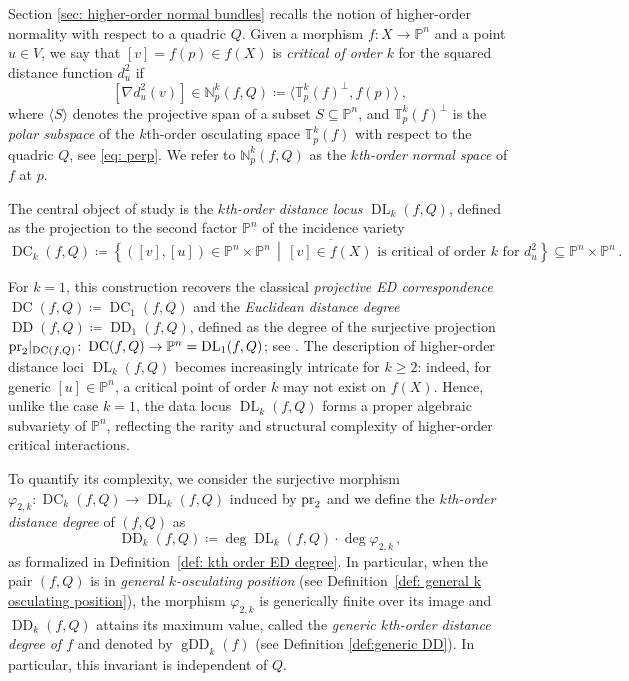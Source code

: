 \documentclass[11pt,reqno]{amsart}
\numberwithin{equation}{section}
\theoremstyle{plain}
\numberwithin{theorem}{section}
\theoremstyle{definition}
\newcommand{\N}{\mathbb{N}}
\renewcommand{\P}{\mathbb{P}}
\newcommand{\T}{\mathbb{T}}
\newcommand{\pr}{{\rm pr}}
\newcommand{\DC}{\operatorname{DC}}
\newcommand{\DL}{\operatorname{DL}}
\newcommand{\DD}{\operatorname{DD}}
\newcommand{\gDD}{\operatorname{gDD}}
\begin{document}
Section \ref{sec: higher-order normal bundles} recalls the notion of higher-order normality with respect to a quadric $Q$. Given a morphism $f\colon X \to \P^n$ and a point $u \in V$, we say that $[v] = f(p) \in f(X)$ is {\em critical of order $k$} for the squared distance function $d_u^2$ if
\[
[\nabla d_u^2(v)] \in \N_p^k(f,Q) \coloneqq \langle \T_p^k(f)^\perp, f(p) \rangle\,,
\]
where $\langle S \rangle$ denotes the projective span of a subset $S \subseteq \P^n$, and $\T_p^k(f)^\perp$ is the {\em polar subspace} of the $k$th-order osculating space $\T_p^k(f)$ with respect to the quadric $Q$, see \eqref{eq: perp}. We refer to $\N_p^k(f,Q)$ as the {\em $k$th-order normal space} of $f$ at $p$.

The central object of study is the {\em $k$th-order distance locus} $\DL_k(f,Q)$, defined as the projection to the second factor $\P^n$ of the incidence variety
\[
\DC_k(f,Q) \coloneqq \overline{\left\{([v], [u]) \in \P^n \times \P^n \,\middle|\, [v] \in f(X) \text{ is critical of order } k \text{ for } d_u^2\right\}}\subseteq\P^n \times \P^n\,.
\]

For $k = 1$, this construction recovers the classical {\em projective ED correspondence} $\DC(f,Q)\coloneqq\DC_1(f,Q)$ and the {\em Euclidean distance degree} $\DD(f,Q)\coloneqq\DD_1(f,Q)$, defined as the degree of the surjective projection $\pr_2|_{\DC(f,Q)}\colon\DC(f,Q)\to\P^n=\DL_1(f,Q)$; see \cite[Theorem 4.4]{DHOST}.
The description of higher-order distance loci $\DL_k(f,Q)$ becomes increasingly intricate for $k \geq 2$: indeed, for generic $[u] \in \P^n$, a critical point of order $k$ may not exist on $f(X)$. Hence, unlike the case $k=1$, the data locus $\DL_k(f,Q)$ forms a proper algebraic subvariety of $\P^n$, reflecting the rarity and structural complexity of higher-order critical interactions.

To quantify its complexity, we consider the surjective morphism $\varphi_{2,k}\colon\DC_k(f,Q)\to\DL_k(f,Q)$ induced by $\pr_2$ and we define the {\em $k$th-order distance degree} of $(f,Q)$ as
\[
\DD_k(f,Q) \coloneqq \deg\DL_k(f,Q) \cdot \deg\varphi_{2,k}\,,
\]
as formalized in Definition~\ref{def: kth order ED degree}. In particular, when the pair $(f,Q)$ is in {\em general $k$-osculating position} (see Definition~\ref{def: general k osculating position}), the morphism $\varphi_{2,k}$ is generically finite over its image and $\DD_k(f,Q)$ attains its maximum value, called the {\em generic $k$th-order distance degree of $f$} and denoted by $\gDD_k(f)$ (see Definition \ref{def:generic DD}). In particular, this invariant is independent of $Q$.
\end{document}
